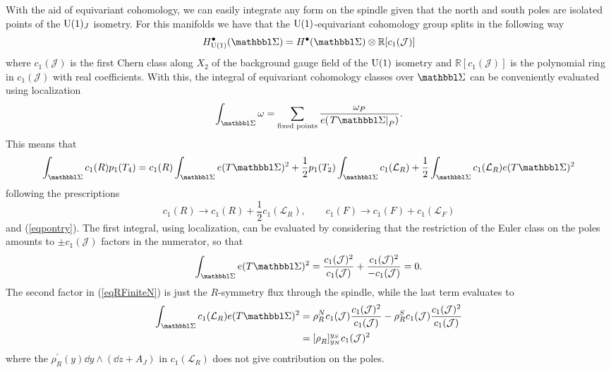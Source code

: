 With the aid of equivariant cohomology, we can easily integrate any form on the spindle given that the north and south poles are isolated points of the $\mathrm{U}(1)_{J}$ isometry. For this manifolds we have that the $\mathrm{U}(1)$-equivariant cohomology group splits in the following way
\begin{equation}
	H^{\bullet}_{\U(1)}(\Spindle)=H^{\bullet}(\Spindle)\otimes \mathbb{R}[c_{1}(\mathcal{J})]
\end{equation}
where $c_{1}(\mathcal{J})$ is the first Chern class along $X_{2}$ of the background gauge field of the $\mathrm{U}(1)$ isometry and $\mathbb{R}[c_{1}(\mathcal{J})]$ is the polynomial ring in $c_{1}(\mathcal{J})$ with real coefficients. With this, the integral of equivariant cohomology classes over $\Spindle$ can be conveniently evaluated using localization
\begin{equation}
	\int_{\Spindle}\omega=\sum_{\text{fixed points}}\frac{\omega_{P}}{e(\left.T\Spindle\right|_{P})}.
\end{equation}
This means that
\begin{equation}
	\int_{\Spindle}c_{1}(R)p_{1}(T_{4})=c_{1}(R)\int_{\Spindle}e(T\Spindle)^{2}+\frac{1}{2}p_{1}(T_{2})\int_{\Spindle}c_{1}(\mathcal{L}_{R})+\frac{1}{2}\int_{\Spindle}c_{1}(\mathcal{L}_{R})e(T\Spindle)^{2}
	\label{eqRFiniteN}
\end{equation}
following the prescriptions
\begin{equation}
	c_{1}(R)\rightarrow c_{1}(R)+\frac{1}{2}c_{1}(\mathcal{L}_{R}),\qquad c_{1}(F)\rightarrow c_{1}(F)+c_{1}(\mathcal{L}_{F})
\end{equation}
and (\ref{eqpontry}). The first integral, using localization, can be evaluated by considering that the restriction of the Euler class on the poles amounts to $\pm c_{1}(\mathcal{J})$ factors in the numerator, so that
\begin{equation}
	\int_{\Spindle}e(T\Spindle)^{2}=\frac{c_{1}(\mathcal{J})^{2}}{c_{1}(\mathcal{J})}+\frac{c_{1}(\mathcal{J})^{2}}{-c_{1}(\mathcal{J})}=0.
\end{equation}
The second factor in (\ref{eqRFiniteN}) is just the $R$-symmetry flux through the spindle, while the last term evaluates to
\begin{equation}
\begin{split}
	\int_{\Spindle}c_{1}(\mathcal{L}_{R})e(T\Spindle)^{2}&=\rho_{R}^{N}c_{1}(\mathcal{J})\frac{c_{1}(\mathcal{J})^{2}}{c_{1}(\mathcal{J})}-\rho_{R}^{S}c_{1}(\mathcal{J})\frac{c_{1}(\mathcal{J})^{2}}{c_{1}(\mathcal{J})}\\
	&=\flux{R}c_{1}(\mathcal{J})^{2}
\end{split}
\end{equation}
where the $\rho^{\prime}_{R}(y)\dd{y}\wedge(\dd{z}+A_{J})$ in $c_{1}(\mathcal{L}_{R})$ does not give contribution on the poles.

